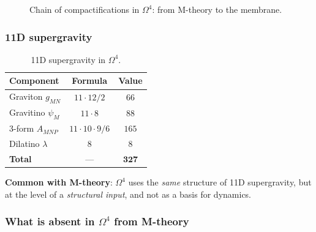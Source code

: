 \documentclass[11pt,a4paper]{article}
\newcommand{\CY}{\ensuremath{CY_3}}
\newcommand{\Om}{\ensuremath{\Omega^4}}
\theoremstyle{definition}
\begin{document}
\begin{figure}[ht]
\centering
{}
\caption{Chain of compactifications in \texorpdfstring{$\Om$}{}: from M-theory to the membrane.}
\label{fig:string-compact-chain}
\end{figure}

\subsubsection{11D supergravity}

\begin{table}[ht]
\centering
\caption{11D supergravity in \texorpdfstring{$\Om$}{}.}
\label{tab:string-sugra}
\begin{tabular}{lcc}
\toprule
Component & Formula & Value \\
\midrule
Graviton $g_{MN}$ & $11 \cdot 12/2$ & $66$ \\
Gravitino $\psi_M$ & $11 \cdot 8$ & $88$ \\
3-form $A_{MNP}$ & $11 \cdot 10 \cdot 9/6$ & $165$ \\
Dilatino $\lambda$ & $8$ & $8$ \\
\midrule
\textbf{Total} & --- & $\mathbf{327}$ \\
\bottomrule
\end{tabular}
\end{table}

\medskip\noindent
\textbf{Common with M-theory}: $\Om$ uses the \emph{same}
structure of 11D supergravity, but at the level of a \emph{structural
input}, and not as a basis for dynamics.

\subsubsection{What is absent in \texorpdfstring{$\Om$}{} from M-theory}
\end{document}
